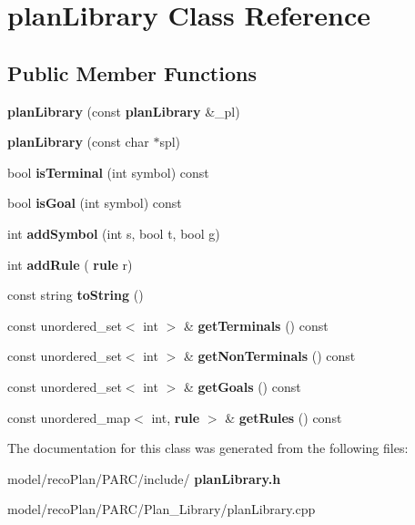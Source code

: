 \section{plan\+Library Class Reference}
\label{classplan_library}
\subsection*{Public Member Functions}
\begin{DoxyCompactItemize}
\item 
\mbox{\label{classplan_library_ad32fd62936aacfd6a66ba0788789589c}} 
{\bfseries plan\+Library} (const \textbf{ plan\+Library} \&\+\_\+pl)
\item 
\mbox{\label{classplan_library_ac23c498458f325de21c20ea810ccf609}} 
{\bfseries plan\+Library} (const char $\ast$spl)
\item 
\mbox{\label{classplan_library_a6f995fa1200fb6ff4fcfe7e77d7e969d}} 
bool {\bfseries is\+Terminal} (int symbol) const
\item 
\mbox{\label{classplan_library_a10dd4ab4e6ac92771e14420682a8cc82}} 
bool {\bfseries is\+Goal} (int symbol) const
\item 
\mbox{\label{classplan_library_adde959ef183ee7f55d47792682383f6b}} 
int {\bfseries add\+Symbol} (int s, bool t, bool g)
\item 
\mbox{\label{classplan_library_af9e0b63486499c9025f5ad4e094f8c42}} 
int {\bfseries add\+Rule} (\textbf{ rule} r)
\item 
\mbox{\label{classplan_library_afd0d1ddca9bff437cf43d13ee6fa8a1b}} 
const string {\bfseries to\+String} ()
\item 
\mbox{\label{classplan_library_a09f0bcb6a4afe166e62e2a28f95d4562}} 
const unordered\+\_\+set$<$ int $>$ \& {\bfseries get\+Terminals} () const
\item 
\mbox{\label{classplan_library_ad60232fcae8cc2b5f9b4d10d25aca244}} 
const unordered\+\_\+set$<$ int $>$ \& {\bfseries get\+Non\+Terminals} () const
\item 
\mbox{\label{classplan_library_adc221719b20bbd5d3de332b11177de54}} 
const unordered\+\_\+set$<$ int $>$ \& {\bfseries get\+Goals} () const
\item 
\mbox{\label{classplan_library_aedd683affefeaac850d80183881f7103}} 
const unordered\+\_\+map$<$ int, \textbf{ rule} $>$ \& {\bfseries get\+Rules} () const
\end{DoxyCompactItemize}


The documentation for this class was generated from the following files\+:\begin{DoxyCompactItemize}
\item 
model/reco\+Plan/\+P\+A\+R\+C/include/\textbf{ plan\+Library.\+h}\item 
model/reco\+Plan/\+P\+A\+R\+C/\+Plan\+\_\+\+Library/plan\+Library.\+cpp\end{DoxyCompactItemize}
